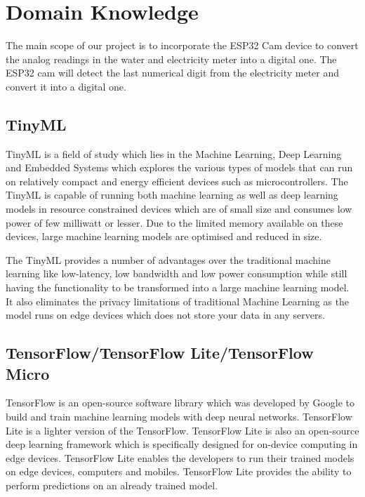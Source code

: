 %
%
%
%


\chapter{Domain Knowledge}\label{DomainKnowledge}

The main scope of our project is to incorporate the ESP32 Cam device to convert the analog readings in the water and electricity meter into a digital one. The ESP32 cam will detect the last numerical digit from the electricity meter and convert it into a digital one.

\section{TinyML}

TinyML is a field of study which lies in the Machine Learning, Deep Learning and Embedded Systems which explores the various types of models that can run on relatively compact and energy efficient devices such as microcontrollers.\cite{Arun:2020} The TinyML is capable of running both machine learning as well as deep learning models in resource constrained devices which are of small size and consumes low power of few milliwatt or lesser. Due to the limited memory available on these devices, large machine learning models are optimised and reduced in size.

The TinyML provides a number of advantages over the traditional machine learning like low-latency, low bandwidth and low power consumption while still having the functionality to be transformed into a large machine learning model. It also eliminates the privacy limitations of traditional Machine Learning as the model runs on edge devices which does not store your data in any servers.\cite{Arun:2020}

\section{TensorFlow/TensorFlow Lite/TensorFlow Micro}
TensorFlow is an open-source software library which was developed by Google to build and train machine learning models with deep neural networks. TensorFlow Lite is a lighter version of the TensorFlow.
TensorFlow Lite is also an open-source deep learning framework which is specifically designed for on-device computing in edge devices. TensorFlow Lite enables the developers to run their trained models on edge devices, computers and mobiles. TensorFlow Lite provides the ability to perform predictions on an already trained model.\cite{Boesch:2022}

